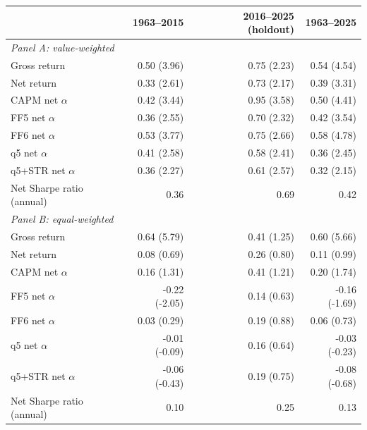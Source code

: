 \begin{tabular}{lrrr}
\toprule
 & 1963--2015 & 2016--2025 (holdout) & 1963--2025 \\
\midrule
\multicolumn{4}{l}{\textit{Panel A: value-weighted}} \\
Gross return & 0.50 (3.96) & 0.75 (2.23) & 0.54 (4.54) \\
Net return & 0.33 (2.61) & 0.73 (2.17) & 0.39 (3.31) \\
CAPM net $\alpha$ & 0.42 (3.44) & 0.95 (3.58) & 0.50 (4.41) \\
FF5 net $\alpha$ & 0.36 (2.55) & 0.70 (2.32) & 0.42 (3.54) \\
FF6 net $\alpha$ & 0.53 (3.77) & 0.75 (2.66) & 0.58 (4.78) \\
q5 net $\alpha$ & 0.41 (2.58) & 0.58 (2.41) & 0.36 (2.45) \\
q5+STR net $\alpha$ & 0.36 (2.27) & 0.61 (2.57) & 0.32 (2.15) \\
Net Sharpe ratio (annual) & 0.36 & 0.69 & 0.42 \\
\midrule
\multicolumn{4}{l}{\textit{Panel B: equal-weighted}} \\
Gross return & 0.64 (5.79) & 0.41 (1.25) & 0.60 (5.66) \\
Net return & 0.08 (0.69) & 0.26 (0.80) & 0.11 (0.99) \\
CAPM net $\alpha$ & 0.16 (1.31) & 0.41 (1.21) & 0.20 (1.74) \\
FF5 net $\alpha$ & -0.22 (-2.05) & 0.14 (0.63) & -0.16 (-1.69) \\
FF6 net $\alpha$ & 0.03 (0.29) & 0.19 (0.88) & 0.06 (0.73) \\
q5 net $\alpha$ & -0.01 (-0.09) & 0.16 (0.64) & -0.03 (-0.23) \\
q5+STR net $\alpha$ & -0.06 (-0.43) & 0.19 (0.75) & -0.08 (-0.68) \\
Net Sharpe ratio (annual) & 0.10 & 0.25 & 0.13 \\
\bottomrule
\end{tabular}
